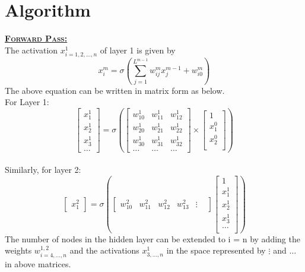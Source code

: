 \documentclass[a4paper,11pt]{article}
\begin{document}
\section{Algorithm}
\large{\textbf{\underline{\textsc{Forward Pass:}}}}\\
The activation $x^1_{i = 1,2,...,n}$ of layer 1 is given by \\
\begin{equation} 
 x_i^m = \sigma
 \left(
 \sum_{j=1}^{L^{m-1}} w_{ij}^m x_j^{m-1} + w_{i0}^m
 \right)
\end{equation}
The above equation can be written in matrix form as below.\\
For Layer 1:
$$
\left[
\begin{matrix}
	x_1^1 \\ x_2^1 \\ x_3^1 \\\hdots
	\end{matrix}
\right]
=
\sigma
\left(
\left[
\begin{matrix}
	w_{10}^1 & w_{11}^1 & w_{12}^1\\
	w_{20 }^1& w_{21}^1 & w_{22}^1 \\
	w_{30}^1 & w_{31}^1 & w_{32}^1\\
	\hdots & \hdots & \hdots
\end{matrix}
\right]
\times
\left[
\begin{matrix}
	1\\ x_1^0 \\x_2^0\\
\end{matrix}
\right]
\right)
$$
\\
Similarly, for layer 2:
$$
\left[
\begin{matrix}
	x_{1}^2
\end{matrix}
\right]
=
\sigma
\left(
\left[
\begin{matrix}
w_{10}^2 & w_{11}^2 & w_{12}^2 & w_{13}^2  & \vdots &
\end{matrix}
\right]
\left[
\begin{matrix}
1\\x_1^1\\x_2^1\\x_3^1 \\ \hdots \\  
\end{matrix}
\right]
\right)
$$
The number of nodes in the hidden layer can be extended to i = n by adding the weights $w^{1,2}_{i=4,...,n}$ and the activations $x^{1}_{3,...,n}$ in the space represented by $\vdots$ and $\hdots$ in above matrices.\\\\
\end{document}

